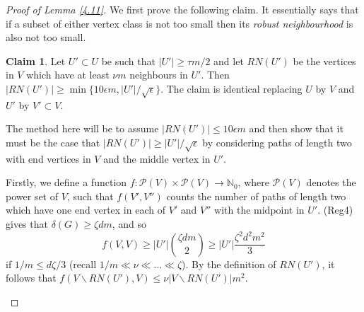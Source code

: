 \documentclass[10pt,letterpaper, reqno]{amsart}
\theoremstyle{definition}
\numberwithin{equation}{section}
\newtheorem{claim}{Claim}
\begin{document}
\begin{proof}[Proof of Lemma \ref{4.11}]
	We first prove the following claim. It essentially says that if a subset of either vertex class is not too small then its \textit{robust neighbourhood} is also not too small.
	
	\begin{claim}
		Let $U' \subset U$ be such that $|U'| \geq \tau m/2$ and let $RN(U')$ be the vertices in $V$ which have at least $\nu m$ neighbours in $U'$. Then $|RN(U')| \geq \min\{10\epsilon m , |U'|/\sqrt{\epsilon}\}$. The claim is identical replacing $U$ by $V$ and $U'$ by $V' \subset V$. 
	\end{claim}
	
	\begin{adjustwidth}{2.5em}{0pt}
		\noindent The method here will be to assume $|RN(U')| \leq 10\epsilon m$ and then show that it must be the case that $|RN(U')| \geq |U'|/\sqrt{\epsilon}$ by considering paths of length two with end vertices in $V$ and the middle vertex in $U'$. 
		
		Firstly, we define a function $f : \mathcal{P}(V) \times \mathcal{P}(V) \to \mathbb{N}_0$, where $\mathcal{P}(V)$ denotes the power set of $V$, such that $f(V',V'')$ counts the number of paths of length two which have one end vertex in each of $V'$ and $V''$ with the midpoint in $U'$. (Reg4) gives that $\delta(G) \geq \zeta d m$, and so 
		\begin{equation}\label{f(V,V) bound}
		 f(V,V) \geq |U'| {\zeta dm \choose 2} \geq |U'| \frac{\zeta^2 d^2 m^2}{3}
		\end{equation} 
		if $1/m \leq d\zeta/3$ (recall $1/m \ll \nu \ll \dots \ll \zeta$). By the definition of $RN(U')$, it follows that $f(V\backslash RN(U'), V) \leq \nu |V \backslash RN(U')|m^2$. 
		

\end{adjustwidth}
\end{proof}
\end{document}
